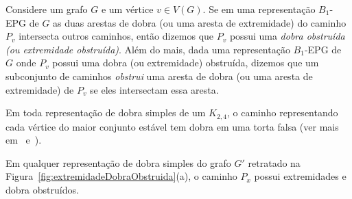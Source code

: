 



\begin{definition}
Considere um grafo $G$ e um vértice $v \in V(G)$. Se em uma representação $B_1$-EPG de $G$ as duas arestas de dobra (ou uma aresta de extremidade) do caminho $P_v$ intersecta outros caminhos, então dizemos que  $P_v$ possui uma \emph{dobra obstruída (ou extremidade obstruída)}. 
Além do mais, dada uma representação $B_1$-EPG de $G$ onde $P_v$ possui uma dobra (ou extremidade) obstruída, dizemos que um subconjunto de caminhos \emph{obstrui} uma aresta de dobra (ou uma aresta de extremidade) de  $P_v$ se eles intersectam essa aresta. 
\end{definition}


\begin{fac} \label{fact:k24facts}
Em toda representação de dobra simples de um $K_{2,4}$, o caminho representando cada vértice do maior conjunto estável tem dobra em uma  torta falsa (ver mais em~\cite{Asinowski2009} e~\cite{daniel2014b}).
\end{fac}


\begin{lema}\label{lem:obstrucao}
Em qualquer representação de dobra simples do grafo  $G'$ retratado na  Figura~\ref{fig:extremidadeDobraObstruida}(a), o caminho $P_x$ possui extremidades e dobra obstruídos.
\end{lema}

